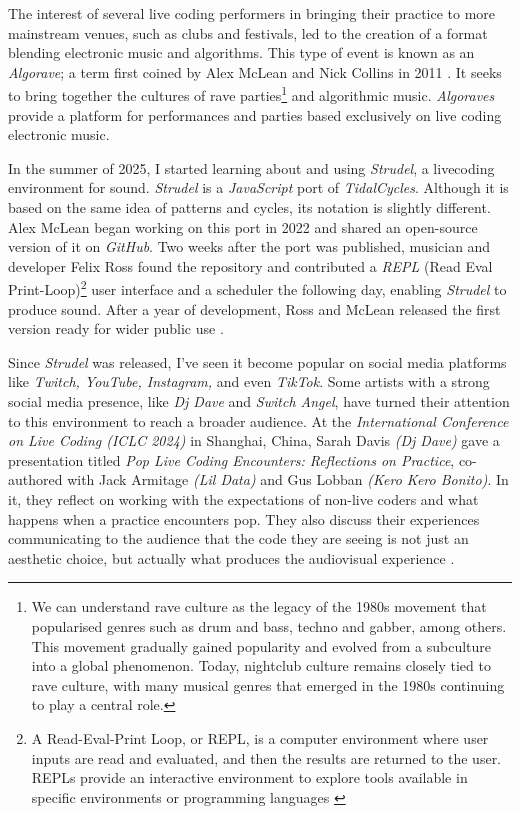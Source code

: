 \documentclass[12pt, twoside, a4paper]{report}
\begin{document}
The interest of several live coding performers in bringing their practice to more mainstream venues, such as clubs and festivals, led to the creation of a format blending electronic music and algorithms. This type of event is known as an \textit{Algorave}; a term first coined by Alex McLean and Nick Collins in 2011 \citep{tidal}. It seeks to bring together the cultures of rave parties\footnote{We can understand rave culture as the legacy of the 1980s movement that popularised genres such as drum and bass, techno and gabber, among others. This movement gradually gained popularity and evolved from a subculture into a global phenomenon. Today, nightclub culture remains closely tied to rave culture, with many musical genres that emerged in the 1980s continuing to play a central role.} and algorithmic music. \textit{Algoraves} provide a platform for performances and parties based exclusively on live coding electronic music.



In the summer of 2025, I started learning about and using \textit{Strudel}, a livecoding environment for sound. 
\textit{Strudel} is a \textit{JavaScript} port of \textit{TidalCycles}. Although it is based on the same idea of 
patterns and cycles, its notation is slightly different. Alex McLean began working on this
 port in 2022 and shared an open-source version of it on \textit{GitHub}. Two weeks after the port was
  published, musician and developer Felix Ross found the repository and contributed a \textit{REPL} (Read Eval Print-Loop)\footnote{A Read-Eval-Print Loop, or REPL, is a computer environment where user inputs are read and evaluated, and then the results are returned to the user. REPLs provide an interactive environment to explore tools available in specific environments or programming languages \citep{repl}} user interface and a scheduler the following day, enabling \textit{Strudel} to produce sound. After a year of development, Ross and McLean released the first version ready for wider public use \citep{strudel}.

Since \textit{Strudel} was released, I've seen it become popular on social media platforms like \textit{Twitch, YouTube, Instagram,} and even \textit{TikTok}. Some artists with a strong social media presence, like \textit{Dj Dave} and \textit{Switch Angel}, have turned their attention to this environment to reach a broader audience. At the \textit{International Conference on Live Coding (ICLC 2024)} in Shanghai, China, Sarah Davis \textit{(Dj Dave)} gave a presentation titled \textit{Pop Live Coding Encounters: Reflections on Practice}, co-authored with Jack Armitage \textit{(Lil Data)} and Gus Lobban \textit{(Kero Kero Bonito)}. In it, they reflect on working with the expectations of non-live coders and what happens when a practice encounters pop. They also discuss their experiences communicating to the audience that the code they are seeing is not just an aesthetic choice, but actually what produces the audiovisual experience \citep{davis}.
\end{document}
